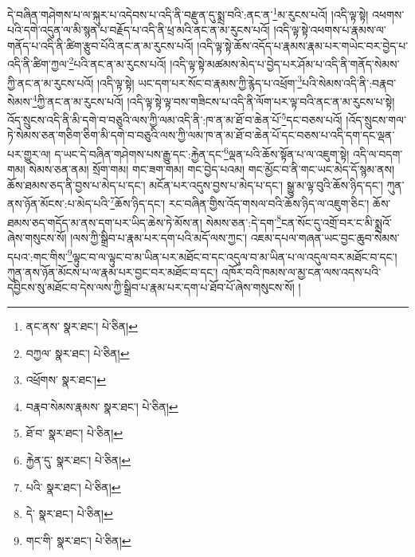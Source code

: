 དེ་བཞིན་གཤེགས་པ་ལ་སྐུར་པ་འདེབས་པ་འདི་ནི་བརྫུན་དུ་སྨྲ་བའི་:ནང་ན་\footnote{ནང་ནས་  སྣར་ཐང་།  པེ་ཅིན། }མ་རུངས་པའོ། །འདི་ལྟ་སྟེ། འཕགས་པའི་དགེ་འདུན་ལ་མི་སྙན་པ་བརྗོད་པ་འདི་ནི་ཕྲ་མའི་ནང་ན་མ་རུངས་པའོ། །འདི་ལྟ་སྟེ་འཕགས་པ་རྣམས་ལ་གནོད་པ་འདི་ནི་ཚིག་རྩུབ་པོའི་ནང་ན་མ་རུངས་པའོ། །འདི་ལྟ་སྟེ་ཆོས་འདོད་པ་རྣམས་རྣམ་པར་གཡེང་བར་བྱེད་པ་འདི་ནི་ཚིག་ཀྱལ་\footnote{བཀྱལ་  སྣར་ཐང་།  པེ་ཅིན། }པའི་ནང་ན་མ་རུངས་པའོ། །འདི་ལྟ་སྟེ་མཚམས་མེད་པ་བྱེད་པར་ཤོམ་པ་འདི་ནི་གནོད་སེམས་ཀྱི་ནང་ན་མ་རུངས་པའོ། །འདི་ལྟ་སྟེ། ཡང་དག་པར་སོང་བ་རྣམས་ཀྱི་རྙེད་པ་འཕྲོག་\footnote{འཕྲོགས་  སྣར་ཐང་། }པའི་སེམས་འདི་ནི་:བརྣབ་སེམས་\footnote{བརྣབ་སེམས་རྣམས་  སྣར་ཐང་།  པེ་ཅིན། }ཀྱི་ནང་ན་མ་རུངས་པའོ། །འདི་ལྟ་སྟེ་ལྟ་བས་གཟིངས་པ་འདི་ནི་ལོག་པར་ལྟ་བའི་ནང་ན་མ་རུངས་པ་སྟེ། འོད་སྲུངས་འདི་ནི་མི་དགེ་བ་བཅུའི་ལས་ཀྱི་ལམ་འདི་ནི་:ཁ་ན་མ་ཐོ་བ་ཆེན་པོ་\footnote{ཐོ་བ་  སྣར་ཐང་།  པེ་ཅིན། }དང་བཅས་པའོ། །འོད་སྲུངས་གལ་ཏེ་སེམས་ཅན་གཅིག་ཅིག་མི་དགེ་བ་བཅུའི་ལས་ཀྱི་ལམ་ཁ་ན་མ་ཐོ་བ་ཆེན་པོ་དང་བཅས་པ་འདི་དག་དང་ལྡན་པར་གྱུར་ལ། ད་ཡང་དེ་བཞིན་གཤེགས་པས་རྒྱུ་དང་:རྐྱེན་དང་\footnote{རྐྱེན་དུ་  སྣར་ཐང་།  པེ་ཅིན། }ལྡན་པའི་ཆོས་སྟོན་པ་ལ་འཇུག་སྟེ། འདི་ལ་བདག་གམ། སེམས་ཅན་ནམ། སྲོག་གམ། གང་ཟག་གམ། གང་བྱེད་པའམ། གང་མྱོང་བ་ནི་གང་ཡང་མེད་དོ་སྙམ་ནས། ཆོས་ཐམས་ཅད་ནི་བྱས་པ་མེད་པ་དང་། མངོན་པར་འདུས་བྱས་པ་མེད་པ་དང་། སྒྱུ་མ་ལྟ་བུའི་ཆོས་ཉིད་དང་། ཀུན་ནས་ཉོན་མོངས་:པ་མེད་པའི་\footnote{པའི་  སྣར་ཐང་།  པེ་ཅིན། }ཆོས་ཉིད་དང་། རང་བཞིན་གྱིས་འོད་གསལ་བའི་ཆོས་ཉིད་ལ་འཇུག་ཅིང་། ཆོས་ཐམས་ཅད་གདོད་མ་ནས་དག་པར་ཡིད་ཆེས་ཏེ་མོས་ན། སེམས་ཅན་:དེ་དག་\footnote{དེ་  སྣར་ཐང་།  པེ་ཅིན། }ངན་སོང་དུ་འགྲོ་བར་ང་མི་སྨྲའོ་ཞེས་གསུངས་སོ། །ལས་ཀྱི་སྒྲིབ་པ་རྣམ་པར་དག་པའི་མདོ་ལས་ཀྱང་། འཇམ་དཔལ་གཞན་ཡང་བྱང་ཆུབ་སེམས་དཔའ་:གང་གིས་\footnote{གང་གི་  སྣར་ཐང་།  པེ་ཅིན། }ལྟུང་བ་ལ་ལྟུང་བ་མ་ཡིན་པར་མཐོང་བ་དང་འདུལ་བ་མ་ཡིན་པ་ལ་འདུལ་བར་མཐོང་བ་དང་། ཀུན་ནས་ཉོན་མོངས་པ་ལ་རྣམ་པར་བྱང་བར་མཐོང་བ་དང་། འཁོར་བའི་ཁམས་ལ་མྱ་ངན་ལས་འདས་པའི་དབྱིངས་སུ་མཐོང་བ་དེས་ལས་ཀྱི་སྒྲིབ་པ་རྣམ་པར་དག་པ་ཐོབ་པོ་ཞེས་གསུངས་སོ། །
